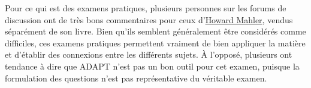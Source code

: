 Pour ce qui est des examens pratiques, plusieurs personnes sur les forums de discussion ont de très bons commentaires pour ceux d'\href{http://howardmahler.com/Teaching/C.html}{Howard Mahler}, vendus séparément de son livre. Bien qu'ils semblent généralement être considérés comme difficiles, ces examens pratiques permettent vraiment de bien appliquer la matière et d'établir des connexions entre les différents sujets. À l'opposé, plusieurs ont tendance à dire que ADAPT n'est pas un bon outil pour cet examen, puisque la formulation des questions n'est pas représentative du véritable examen. 





\newpage
